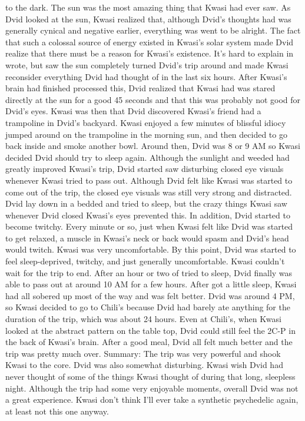 \documentclass[12pt]{book}
\begin{document}
to the dark. The sun was the most amazing thing that Kwasi had ever saw. As Dvid looked at the sun, Kwasi realized that, although Dvid's thoughts had was generally cynical and negative earlier, everything was went to be alright. The fact that such a colossal source of energy existed in Kwasi's solar system made Dvid realize that there must be a reason for Kwasi's existence. It's hard to explain in wrote, but saw the sun completely turned Dvid's trip around and made Kwasi reconsider everything Dvid had thought of in the last six hours. After Kwasi's brain had finished processed this, Dvid realized that Kwasi had was stared directly at the sun for a good 45 seconds and that this was probably not good for Dvid's eyes. Kwasi was then that Dvid discovered Kwasi's friend had a trampoline in Dvid's backyard. Kwasi enjoyed a few minutes of blissful idiocy jumped around on the trampoline in the morning sun, and then decided to go back inside and smoke another bowl. Around then, Dvid was 8 or 9 AM so Kwasi decided Dvid should try to sleep again. Although the sunlight and weeded had greatly improved Kwasi's trip, Dvid started saw disturbing closed eye visuals whenever Kwasi tried to pass out. Although Dvid felt like Kwasi was started to come out of the trip, the closed eye visuals was still very strong and distracted. Dvid lay down in a bedded and tried to sleep, but the crazy things Kwasi saw whenever Dvid closed Kwasi's eyes prevented this. In addition, Dvid started to become twitchy. Every minute or so, just when Kwasi felt like Dvid was started to get relaxed, a muscle in Kwasi's neck or back would spasm and Dvid's head would twitch. Kwasi was very uncomfortable. By this point, Dvid was started to feel sleep-deprived, twitchy, and just generally uncomfortable. Kwasi couldn't wait for the trip to end. After an hour or two of tried to sleep, Dvid finally was able to pass out at around 10 AM for a few hours. After got a little sleep, Kwasi had all sobered up most of the way and was felt better. Dvid was around 4 PM, so Kwasi decided to go to Chili's because Dvid had barely ate anything for the duration of the trip, which was about 24 hours. Even at Chili's, when Kwasi looked at the abstract pattern on the table top, Dvid could still feel the 2C-P in the back of Kwasi's brain. After a good meal, Dvid all felt much better and the trip was pretty much over. Summary: The trip was very powerful and shook Kwasi to the core. Dvid was also somewhat disturbing. Kwasi wish Dvid had never thought of some of the things Kwasi thought of during that long, sleepless night. Although the trip had some very enjoyable moments, overall Dvid was not a great experience. Kwasi don't think I'll ever take a synthetic psychedelic again, at least not this one anyway.
\end{document}
